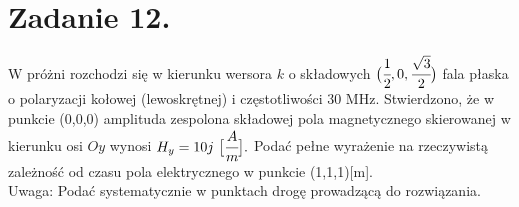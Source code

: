 \section*{Zadanie 12.}
\begin{task}
W próżni rozchodzi się w kierunku wersora $k$ o składowych $\big{(}\cfrac{1}{2},0,\cfrac{\sqrt{3}}{2}\big{)}$ fala płaska o polaryzacji kołowej (lewoskrętnej) i częstotliwości 30 MHz. Stwierdzono, że w punkcie (0,0,0) amplituda zespolona składowej pola magnetycznego skierowanej w kierunku osi $Oy$ wynosi $H_{y}=10j\ \big{[}\cfrac{A}{m}\big{]}.\\$
Podać pełne wyrażenie na rzeczywistą zależność od czasu pola elektrycznego w punkcie (1,1,1)[m].\\
Uwaga: Podać systematycznie w punktach drogę prowadzącą do rozwiązania.\\
\end{task}

